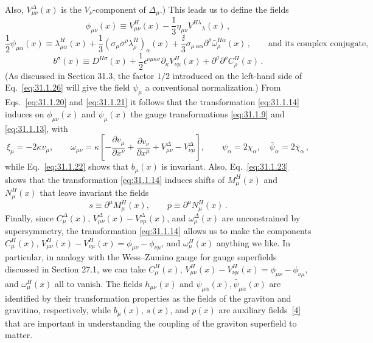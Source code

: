 Also, \(V_{\mu\nu}^\Delta(x)\) is the \(V_\nu\)-component of
\(\Delta_\mu\).) This leads us to define the fields
\begin{equation}
  \phi_{\mu\nu}(x)
  \equiv V_{\mu\nu}^H(x)
  -\frac13\eta_{\mu\nu}V^{H\lambda}{}_\lambda(x)\,,
  \tag{31.1.25}\label{eq:31.1.25}
\end{equation}
\begin{equation}
  \frac12\psi_{\mu\alpha}(x)
  \equiv\lambda_{\mu\alpha}^H(x)
  +\frac13(\sigma_\mu\bar\sigma^\rho
    \lambda_\rho^H)_\alpha(x)
  +\frac{\ii}{3}\sigma_{\mu\,\alpha\dot\alpha}
    \partial^\rho\bar\omega_\rho^{H\dot\alpha}(x)\,,
  \qquad\text{and its complex conjugate},
  \tag{31.1.26}\label{eq:31.1.26}
\end{equation}
\begin{equation}
  b^\sigma(x)
  \equiv D^{H\sigma}(x)
  +\frac12\epsilon^{\nu\mu\kappa\sigma}
    \partial_\kappa V_{\nu\mu}^H(x)
  +\partial^\sigma\partial^\rho C_\rho^H(x)\,.
  \tag{31.1.27}\label{eq:31.1.27}
\end{equation}
(As discussed in Section 31.3, the factor \(1/2\) introduced on the left-hand
side of Eq.~\eqref{eq:31.1.26} will give the field \(\psi_\mu\) a
conventional normalization.) From Eqs.~\eqref{eq:31.1.20} and
\eqref{eq:31.1.21} it follows that the transformation \eqref{eq:31.1.14}
induces on \(\phi_{\mu\nu}(x)\) and \(\psi_\mu(x)\) the gauge transformations
\eqref{eq:31.1.9} and \eqref{eq:31.1.13}, with
\begin{equation}
  \xi_\mu=-2\kappa v_\mu,\qquad
  \omega_{\mu\nu}
  =\kappa\left[
    -\frac{\partial v_\mu}{\partial x^\nu}
    +\frac{\partial v_\nu}{\partial x^\mu}
    +V_{\mu\nu}^\Delta-V_{\nu\mu}^\Delta
  \right],\qquad
  \psi_\alpha=2\chi_\alpha,\quad
  \bar\psi_{\dot\alpha}=2\bar\chi_{\dot\alpha}\,,
  \tag{31.1.28}\label{eq:31.1.28}
\end{equation}
while Eq.~\eqref{eq:31.1.22} shows that \(b_\mu(x)\) is invariant. Also,
Eq.~\eqref{eq:31.1.23} shows that the transformation \eqref{eq:31.1.14}
induces shifts of \(M_\mu^H(x)\) and \(N_\mu^H(x)\) that leave invariant the
fields
\begin{equation}
  s\equiv\partial^\mu M_\mu^H(x),\qquad
  p\equiv\partial^\mu N_\mu^H(x)\,.
  \tag{31.1.29}\label{eq:31.1.29}
\end{equation}
Finally, since \(C_\mu^\Delta(x)\),
\(V_{\mu\nu}^\Delta(x)-V_{\nu\mu}^\Delta(x)\), and
\(\omega_\mu^\Delta(x)\) are unconstrained by supersymmetry, the
transformation \eqref{eq:31.1.14} allows us to make the components
\(C_\mu^H(x)\),
\(V_{\mu\nu}^H(x)-V_{\nu\mu}^H(x)=\phi_{\mu\nu}-\phi_{\nu\mu}\), and
\(\omega_\mu^H(x)\) anything we like. In particular, in analogy with the
Wess--Zumino gauge for gauge superfields discussed in Section 27.1, we can
take \(C_\mu^H(x)\),
\(V_{\mu\nu}^H(x)-V_{\nu\mu}^H(x)=\phi_{\mu\nu}-\phi_{\nu\mu}\), and
\(\omega_\mu^H(x)\) all to vanish. The fields \(h_{\mu\nu}(x)\) and
\(\psi_{\mu\alpha}(x),\bar\psi_{\mu\dot\alpha}(x)\) are identified by
their transformation properties as the
fields of the graviton and gravitino, respectively, while \(b_\mu(x)\),
\(s(x)\), and \(p(x)\) are auxiliary
fields~\hyperref[ch31-ref-4]{[4]} that are important in understanding the
coupling of the graviton superfield to matter.

